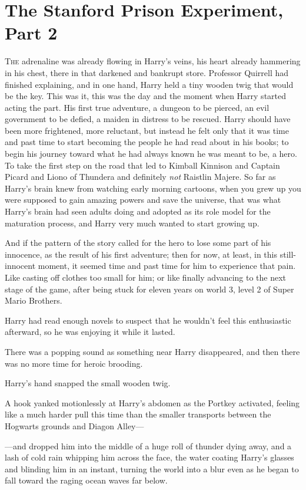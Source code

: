 \chapter{The Stanford Prison Experiment, Part 2}

\lettrine{T}{he} adrenaline
was already flowing in Harry's veins, his heart already hammering in his chest,
there in that darkened and bankrupt store. Professor Quirrell had finished
explaining, and in one hand, Harry held a tiny wooden twig that would be the
key. This was it, this was the day and the moment when Harry started acting the
part. His first true adventure, a dungeon to be pierced, an evil government to
be defied, a maiden in distress to be rescued. Harry should have been more
frightened, more reluctant, but instead he felt only that it was time and past
time to start becoming the people he had read about in his books; to begin his
journey toward what he had always known he was meant to be, a hero. To take the
first step on the road that led to Kimball Kinnison and Captain Picard and
Liono of Thundera and definitely \emph{not} Raistlin Majere. So far as Harry's
brain knew from watching early morning cartoons, when you grew up you were
supposed to gain amazing powers and save the universe, that was what Harry's
brain had seen adults doing and adopted as its role model for the maturation
process, and Harry very much wanted to start growing up.

And if the pattern of the story called for the hero to lose some part of his
innocence, as the result of his first adventure; then for now, at least, in
this still-innocent moment, it seemed time and past time for him to experience
that pain. Like casting off clothes too small for him; or like finally
advancing to the next stage of the game, after being stuck for eleven years on
world 3, level 2 of Super Mario Brothers.

Harry had read enough novels to suspect that he wouldn't feel this enthusiastic
afterward, so he was enjoying it while it lasted.

There was a popping sound as something near Harry disappeared, and then there
was no more time for heroic brooding.

Harry's hand snapped the small wooden twig.

A hook yanked motionlessly at Harry's abdomen as the Portkey activated, feeling
like a much harder pull this time than the smaller transports between the
Hogwarts grounds and Diagon Alley---

---and dropped him into the middle of a huge roll of thunder dying away, and a
lash of cold rain whipping him across the face, the water coating Harry's
glasses and blinding him in an instant, turning the world into a blur even as
he began to fall toward the raging ocean waves far below.

